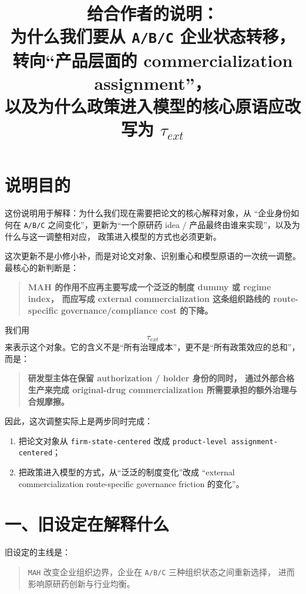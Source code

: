 \documentclass[12pt,fontset=none]{ctexart}
\title{给合作者的说明：\\
为什么我们要从 \texttt{A/B/C} 企业状态转移，转向“产品层面的 commercialization assignment”，\\
以及为什么政策进入模型的核心原语应改写为 \texorpdfstring{$\tau_{ext}$}{tau\_ext}
}
\author{}
\date{}
\begin{document}
\maketitle

\section*{说明目的}

这份说明用于解释：为什么我们现在需要把论文的核心解释对象，从
“企业身份如何在 \texttt{A/B/C} 之间变化”，更新为“一个原研药
idea / 产品最终由谁来实现”，以及为什么与这一调整相对应，
政策进入模型的方式也必须更新。

这次更新不是小修小补，而是对论文对象、识别重心和模型原语的一次统一调整。
最核心的新判断是：

\begin{quote}
\textbf{MAH 的作用不应再主要写成一个泛泛的制度 dummy 或 regime index，
而应写成 external commercialization 这条组织路线的
route-specific governance/compliance cost 的下降。}
\end{quote}

我们用
\[
\tau_{ext}
\]
来表示这个对象。它的含义不是“所有治理成本”，更不是“所有政策效应的总和”，
而是：

\begin{quote}
\textbf{研发型主体在保留 authorization / holder 身份的同时，
通过外部合格生产来完成 original-drug commercialization 所需要承担的额外治理与合规摩擦。}
\end{quote}

因此，这次调整实际上是两步同时完成：

\begin{enumerate}[leftmargin=2em]
    \item 把论文对象从 \texttt{firm-state-centered} 改成
    \texttt{product-level assignment-centered}；
    \item 把政策进入模型的方式，从“泛泛的制度变化”改成
    “external commercialization route-specific governance friction 的变化”。
\end{enumerate}

\section{一、旧设定在解释什么}

旧设定的主线是：

\begin{quote}
\texttt{MAH} 改变企业组织边界，企业在 \texttt{A/B/C} 三种组织状态之间重新选择，
进而影响原研药创新与行业均衡。
\end{quote}
\end{document}
